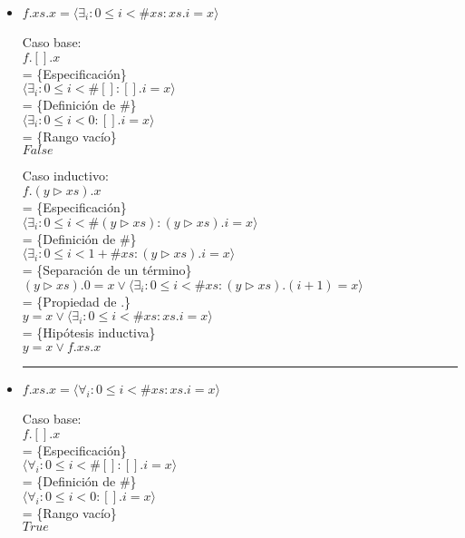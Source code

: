 \documentclass[12pt]{article}
\begin{document}
\begin{itemize}
    \rule{\linewidth}{1px}

    \item $ f.xs.x = \langle \exists_i : 0 \le i < \#xs : xs.i = x \rangle $

    \bigbreak 

    Caso base:\\
    $ f.[].x $\\
    = \{Especificación\}\\
    $ \langle \exists_i : 0 \le i < \#[] : [].i = x \rangle $\\
    = \{Definición de \#\}\\
    $ \langle \exists_i : 0 \le i < 0 : [].i = x \rangle $\\
    = \{Rango vacío\}\\
    $ False $

    \bigbreak

    Caso inductivo:\\
    $ f.(y \triangleright xs).x $\\
    = \{Especificación\}\\
    $ \langle \exists_i : 0 \le i < \#(y \triangleright xs) : (y \triangleright xs).i = x \rangle $\\
    = \{Definición de \#\}\\
    $ \langle \exists_i : 0 \le i < 1 + \#xs : (y \triangleright xs).i = x \rangle $\\
    = \{Separación de un término\}\\
    $ (y \triangleright xs).0 = x \lor \langle \exists_i : 0 \le i < \#xs : (y \triangleright xs).(i + 1) = x \rangle $\\
    = \{Propiedad de .\}\\
    $ y = x \lor \langle \exists_i : 0 \le i < \#xs : xs.i = x \rangle $\\
    = \{Hipótesis inductiva\}\\
    $ y = x \lor f.xs.x $

    \rule{\linewidth}{1px}

    \item $ f.xs.x = \langle \forall_i : 0 \le i < \#xs : xs.i = x \rangle $

    \bigbreak

    Caso base:\\
    $ f.[].x $\\
    = \{Especificación\}\\
    $ \langle \forall_i : 0 \le i < \#[] : [].i = x \rangle $\\
    = \{Definición de \#\}\\
    $ \langle \forall_i : 0 \le i < 0 : [].i = x \rangle $\\
    = \{Rango vacío\}\\
    $ True $


\end{itemize}
\end{document}
